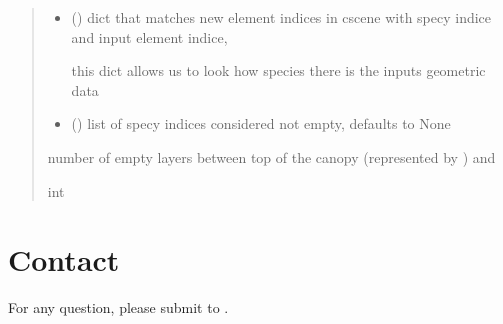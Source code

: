 \documentclass[letterpaper,10pt,english]{sphinxmanual}
\begin{document}
\begin{fulllineitems}
\begin{quote}
\begin{description}
\begin{itemize}
\item {} 
\sphinxAtStartPar
{} () \textendash{} 
\sphinxAtStartPar
dict that matches new element indices in cscene with specy indice and
input element indice,

\begin{sphinxVerbatim}[commandchars=\\\{\}]
      
\end{sphinxVerbatim}

\sphinxAtStartPar
this dict allows us to look how species there is the inputs geometric data


\item {} 
\sphinxAtStartPar
{} (\sphinxstyleliteralemphasis{\sphinxupquote{, }}) \textendash{} list of specy indices considered not empty, defaults to None

\end{itemize}

\sphinxAtStartPar
number of empty layers between top of the canopy (represented by ) and 

\sphinxAtStartPar
int

\end{description}\end{quote}

\end{fulllineitems}



\chapter{Contact}
\label{\detokenize{index:contact}}
\sphinxAtStartPar
For any question, please submit to .
\end{document}
